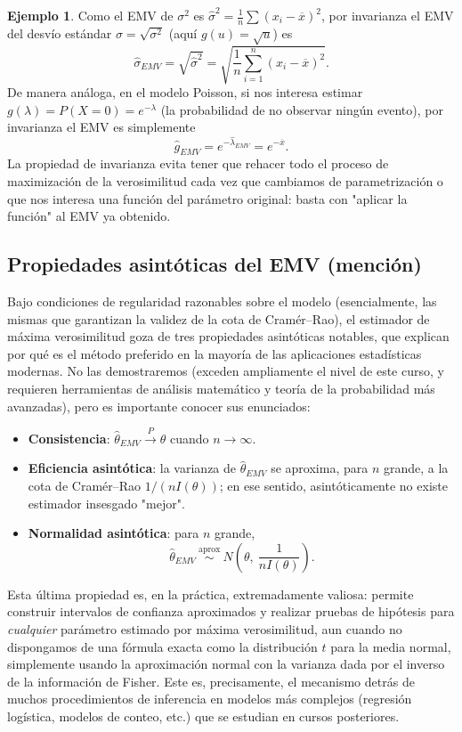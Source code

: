 \documentclass[11pt,a4paper]{article}
\theoremstyle{plain}
\theoremstyle{definition}
\newtheorem{ejemplo}[teorema]{Ejemplo}
\theoremstyle{remark}
\begin{document}
\begin{ejemplo}
Como el EMV de $\sigma^2$ es $\widehat\sigma^2=\frac1n\sum(x_i-\overline x)^2$, por invarianza el EMV del desvío estándar $\sigma=\sqrt{\sigma^2}$ (aquí $g(u)=\sqrt u$) es
\[
\widehat\sigma_{EMV} = \sqrt{\widehat\sigma^2} = \sqrt{\frac1n\sum_{i=1}^n (x_i-\overline x)^2}.
\]
De manera análoga, en el modelo Poisson, si nos interesa estimar $g(\lambda)=P(X=0)=e^{-\lambda}$ (la probabilidad de no observar ningún evento), por invarianza el EMV es simplemente
\[
\widehat{g}_{EMV} = e^{-\widehat\lambda_{EMV}} = e^{-\overline x}.
\]
La propiedad de invarianza evita tener que rehacer todo el proceso de maximización de la verosimilitud cada vez que cambiamos de parametrización o que nos interesa una función del parámetro original: basta con "aplicar la función" al EMV ya obtenido.
\end{ejemplo}

\subsection{Propiedades asintóticas del EMV (mención)}

Bajo condiciones de regularidad razonables sobre el modelo (esencialmente, las mismas que garantizan la validez de la cota de Cramér--Rao), el estimador de máxima verosimilitud goza de tres propiedades asintóticas notables, que explican por qué es el método preferido en la mayoría de las aplicaciones estadísticas modernas. No las demostraremos (exceden ampliamente el nivel de este curso, y requieren herramientas de análisis matemático y teoría de la probabilidad más avanzadas), pero es importante conocer sus enunciados:

\begin{itemize}[leftmargin=1.3cm]
\item \textbf{Consistencia}: $\widehat\theta_{EMV}\xrightarrow{P}\theta$ cuando $n\to\infty$.
\item \textbf{Eficiencia asintótica}: la varianza de $\widehat\theta_{EMV}$ se aproxima, para $n$ grande, a la cota de Cramér--Rao $1/(nI(\theta))$; en ese sentido, asintóticamente no existe estimador insesgado "mejor".
\item \textbf{Normalidad asintótica}: para $n$ grande,
\[
\widehat\theta_{EMV} \ \overset{\text{aprox}}{\sim}\ N\left(\theta,\ \frac{1}{nI(\theta)}\right).
\]
\end{itemize}

Esta última propiedad es, en la práctica, extremadamente valiosa: permite construir intervalos de confianza aproximados y realizar pruebas de hipótesis para \emph{cualquier} parámetro estimado por máxima verosimilitud, aun cuando no dispongamos de una fórmula exacta como la distribución $t$ para la media normal, simplemente usando la aproximación normal con la varianza dada por el inverso de la información de Fisher. Este es, precisamente, el mecanismo detrás de muchos procedimientos de inferencia en modelos más complejos (regresión logística, modelos de conteo, etc.) que se estudian en cursos posteriores.
\end{document}
